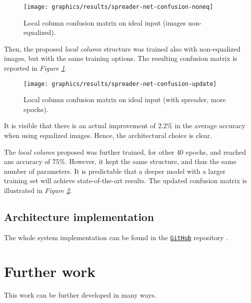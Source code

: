 \begin{figure}
	\centering
	\texttt{[image: graphics/results/spreader-net-confusion-noneq]}
	\caption{Local column confusion matrix on ideal input (images non-equalized).}\label{fig:local-confusion-noneq}
\end{figure}
\par{
	Then, the proposed \emph{local column} structure was trained also with non-equalized images, but with the same training options. The resulting confusion matrix is reported in \emph{Figure \ref{fig:local-confusion-noneq}}.
}
\begin{figure}
	\centering
	\texttt{[image: graphics/results/spreader-net-confusion-update]}
	\caption{Local column confusion matrix on ideal input (with spreader, more epochs).}\label{fig:local-confusion-spreader-update}
\end{figure}
\par{
	It is visible that there is an actual improvement of $2.2\%$ in the average accuracy when using equalized images. Hence, the architectural choice is clear. 
}
\par{
	The \emph{local column} proposed was further trained, for other $40$ epochs, and reached ans accuracy of $75\%$. However, it kept the same structure, and thus the same number of parameters. It is predictable that a deeper model with a larger training set will achieve state-of-the-art results. The updated confusion matrix is illustrated in \emph{Figure \ref{fig:local-confusion-spreader-update}}.
}
\subsection{Architecture implementation}
\par{
	The whole system implementation can be found in the \href{https://github.com/antonioterpin/wavelet_ml}{\texttt{GitHub}} repository \cite{antonioterpin:github}.
}

\section{Further work}\label{section:further-work}
\par{
	This work can be further developed in many ways.
}
